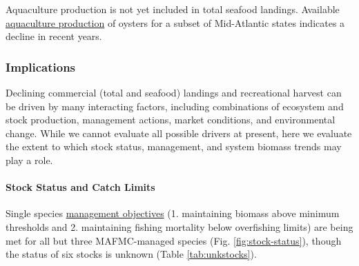 \documentclass[
  10pt,
]{article}
\begin{document}
Aquaculture production is not yet included in total seafood landings. Available \href{https://noaa-edab.github.io/catalog/aquaculture.html}{aquaculture production} of oysters for a subset of Mid-Atlantic states indicates a decline in recent years.

\subsubsection{Implications}\label{implications}

Declining commercial (total and seafood) landings and recreational harvest can be driven by many interacting factors, including combinations of ecosystem and stock production, management actions, market conditions, and environmental change. While we cannot evaluate all possible drivers at present, here we evaluate the extent to which stock status, management, and system biomass trends may play a role.

\paragraph{Stock Status and Catch Limits}\label{stock-status-and-catch-limits}

Single species \href{https://noaa-edab.github.io/catalog/stock_status.html}{management objectives} (1. maintaining biomass above minimum thresholds and 2. maintaining fishing mortality below overfishing limits) are being met for all but three MAFMC-managed species (Fig. \ref{fig:stock-status}), though the status of six stocks is unknown (Table \ref{tab:unkstocks}).
\end{document}
